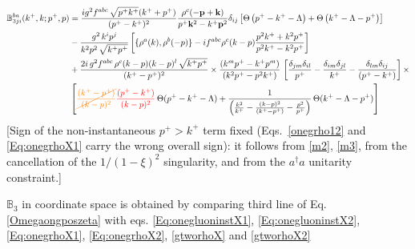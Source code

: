 \documentclass[aps,prd,amsmath,amssymb,nofootinbib]{revtex4-2}
\def\mf#1{\mathbb{#1}}
\def\v#1{\mathbf{#1}}
\numberwithin{equation}{section}
\begin{document}
\begin{align}
    \mf{B}^{ba}_{3ji}(k^{+},k; p^{+},p) & =  \frac{ig^2 f^{abc}\,\sqrt{p^{+}k^{+}} (k^++p^+) } {(p^+-k^+)^2} \frac{\rho^c(-\v{p}+\v{k})}{p^{+}\v{k}^2 - k^{+}\v{p}^2} \delta_{ij}\left[\Theta\left(p^{+} - k^{+} - \Lambda\right)+\Theta\left(k^{+}-\Lambda-p^{+}\right)\right]\notag \\ & -\frac{g^{2}\,k^{i}p^{j}}{k^{2}p^{2}\,\sqrt{k^{+}p^{+}}}\left[\{\rho^{a}(k),\rho^{b}(-p)\}-if^{abc}\rho^{c}(k-p)\frac{p^{2}k^{+}+k^{2}p^{+}}{p^{2}k^{+}-k^{2}p^{+}}\right]\notag \\ & +\frac{2i\,g^{2}f^{abc}\,\rho^{c}(k-p)(k-p)^{l}\,\sqrt{k^{+}p^{+}}}{(k^{+}-p^{+})^{2}}\times \frac{\left(k^{m}p^{+}-k^{+}p^{m}\right)}{\left(k^{2}p^{+}-p^{2}k^{+}\right)}\,\left[\frac{\delta_{jm}\delta_{il}}{p^{+}}-\frac{\delta_{im}\delta_{jl}}{k^{+}}-\frac{\delta_{lm}\delta_{ij}}{(p^{+}-k^{+})}\right]\times \notag \\ & \left[{\color{orange}\cancel{\frac{(k^{+}-p^{+})}{(k-p)^{2}}}}{\color{red}\frac{(p^{+}-k^{+})}{(k-p)^{2}}}\,\Theta(p^{+}-k^{+}-\Lambda)+\frac{1}{\left(\frac{k^{2}}{k^{+}}-\frac{(k-p)^{2}}{(k^{+}-p^{+})}-\frac{p^{2}}{p^{+}}\right)}\,\Theta(k^{+}-\Lambda-p^{+})\right]
\end{align} {\color{red}[Sign of the non-instantaneous $p^+>k^+$ term fixed (Eqs.~\eqref{onegrho12} and \eqref{Eq:onegrhoX1} carry the wrong overall sign): it follows from \eqref{m2}, \eqref{m3}, from the cancellation of the $1/(1-\xi)^2$ singularity, and from the $a^\dagger a$ unitarity constraint.]}\par\noindent 
$\mf{B}_{3}$ in coordinate space is obtained by comparing third line of Eq.~ \eqref{Omegaongposzeta} with eqs. \eqref{Eq:onegluoninstX1}, \eqref{Eq:onegluoninstX2}, \eqref{Eq:onegrhoX1}, \eqref{Eq:onegrhoX2}, \eqref{gtworhoX} and \eqref{gtworhoX2}
\end{document}

